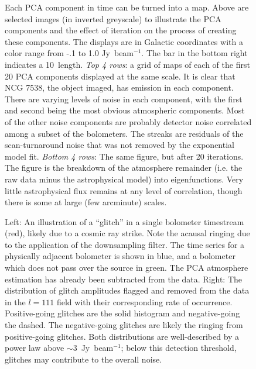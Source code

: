 \documentclass[12pt,preprint]{aastex}
\newcommand{\lon}{\ensuremath{l}}
\newcommand\jyb{Jy~beam$^{-1}$}
\def\FigureTwo#1#2#3#4#5{
\begin{figure}[htb]
\epsscale{#5}
\plottwo{#1}{#2}
\caption{#3}
\label{#4}
\end{figure}
}
\begin{document}
\begin{figure}
\begin{minipage}{6.5in}
\begin{center}
    \end{center}
  \end{minipage}
  \caption{Each PCA component in time can be turned into a map.  Above
are selected images (in inverted greyscale) to illustrate the PCA
components and the effect of iteration on the process of creating
these components.  The displays are in Galactic coordinates with a
color range from -.1 to 1.0 \jyb.  The bar in the bottom right
indicates a 10\arcmin\ length.  {\it Top 4 rows}: a grid of maps of
each of the first 20 PCA components displayed at the same scale.  It
is clear that NCG 7538, the object imaged, has emission in each
component.  There are varying levels of noise in each component, with
the first and second being the most obvious atmospheric components.
Most of the other noise components are probably detector noise
correlated among a subset of the bolometers.  The streaks are
residuals of the scan-turnaround noise that was not removed by the
exponential model fit.  {\it Bottom 4 rows}: The same figure, but
after 20 iterations.  The figure is the breakdown of the atmosphere
remainder (i.e.  the raw data minus the astrophysical model) into
eigenfunctions.  Very little astrophysical flux remains at any level
of correlation, though there is some at large (few arcminute) scales.}
\label{fig:PCA_Graphical}

\end{figure}

\FigureTwo{f8a}{f8b}%
{Left: An illustration of a ``glitch'' in a single bolometer
timestream (red), likely due to a cosmic ray strike.  Note the acausal
ringing due to the application of the downsampling filter.  The time
series for a physically adjacent bolometer is shown in blue, and a
bolometer which does not pass over the source in green.  The PCA
atmosphere estimation has already been subtracted from the
data. Right: The distribution of glitch amplitudes flagged and removed
from the data in the $\lon=111$ field with their corresponding rate of
occurrence.  Positive-going glitches are the solid histogram and
negative-going the dashed.  The negative-going glitches are likely the
ringing from positive-going glitches.  Both distributions are
well-described by a power law above $\sim 3$~\jyb; below this
detection threshold, glitches may contribute to the overall
noise.}{fig:Glitches}{0.8}
\end{document}
